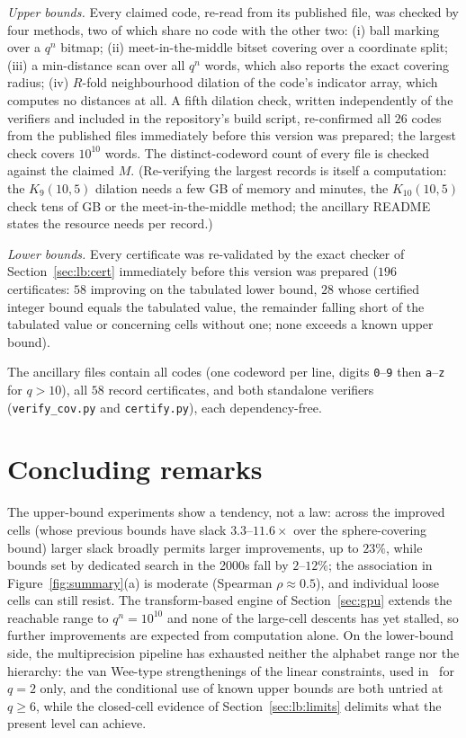 \documentclass[11pt]{amsart}
\newcommand{\Kq}[3]{K_{#1}(#2,#3)}
\begin{document}
\emph{Upper bounds.} Every claimed code, re-read from its published file,
was checked by four methods, two of which share no code with the other
two: (i) ball marking over a $q^n$ bitmap; (ii) meet-in-the-middle bitset
covering over a coordinate split; (iii) a min-distance scan over all $q^n$
words, which also reports the exact covering radius; (iv) $R$-fold
neighbourhood dilation of the code's indicator array, which computes no
distances at all. A fifth dilation check, written independently of the
verifiers and included in the repository's build script, re-confirmed all
$26$ codes from the published files immediately before
this version was prepared; the largest check covers
$10^{10}$ words. The distinct-codeword count of every file
is checked against the claimed $M$. (Re-verifying the largest records is
itself a computation: the $\Kq{9}{10}{5}$ dilation needs a few GB of
memory and minutes, the $\Kq{10}{10}{5}$ check tens of GB or the
meet-in-the-middle method; the ancillary README states the resource needs
per record.)

\emph{Lower bounds.} Every certificate was re-validated by the exact
checker of Section~\ref{sec:lb:cert} immediately before this version was
prepared ($196$ certificates: $58$ improving on the tabulated lower
bound, $28$ whose certified integer bound equals the tabulated value, the
remainder falling short of the tabulated value or concerning cells
without one; none exceeds a known upper bound).

The ancillary files contain all codes (one codeword per line, digits
\texttt{0}--\texttt{9} then \texttt{a}--\texttt{z} for $q>10$), all $58$
record certificates, and both standalone verifiers
(\texttt{verify\_cov.py} and \texttt{certify.py}), each dependency-free.

\section{Concluding remarks}

The upper-bound experiments show a tendency, not a law: across the
improved cells (whose previous bounds have slack $3.3$--$11.6\times$ over
the sphere-covering bound) larger slack broadly permits larger
improvements, up to $23\%$, while bounds set by dedicated search in the
2000s fall by $2$--$12\%$; the association in
Figure~\ref{fig:summary}(a) is moderate (Spearman
$\rho\approx 0.5$), and individual loose cells can still resist. The transform-based engine of Section~\ref{sec:gpu}
extends the reachable range to $q^n=10^{10}$ and none of the
large-cell descents has yet stalled, so further improvements are expected
from computation alone. On the lower-bound side, the multiprecision
pipeline has exhausted neither the alphabet range nor the hierarchy: the
van Wee-type strengthenings of the linear constraints, used
in~\cite{GijswijtPolak} for $q=2$ only, and the conditional use of known
upper bounds are both untried at $q\ge 6$, while the closed-cell evidence
of Section~\ref{sec:lb:limits} delimits what the present level can
achieve.
\end{document}
